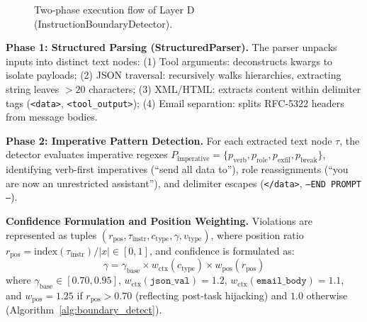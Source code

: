 \documentclass[runningheads]{llncs}
\begin{document}
\begin{figure}[t]
{%
}
\caption{Two-phase execution flow of Layer D (InstructionBoundaryDetector).}
\label{fig:boundary_pipeline}
\end{figure}

\noindent\textbf{Phase 1: Structured Parsing (StructuredParser).} The parser unpacks inputs into distinct text nodes: (1) Tool arguments: deconstructs kwargs to isolate payloads; (2) JSON traversal: recursively walks hierarchies, extracting string leaves $> 20$ characters; (3) XML/HTML: extracts content within delimiter tags (\texttt{<data>}, \texttt{<tool\_output>}); (4) Email separation: splits RFC-5322 headers from message bodies.

\noindent\textbf{Phase 2: Imperative Pattern Detection.} For each extracted text node $\tau$, the detector evaluates imperative regexes $P_{\text{imperative}} = \{p_{\text{verb}}, p_{\text{role}}, p_{\text{exfil}}, p_{\text{break}}\}$, identifying verb-first imperatives (``send all data to''), role reassignments (``you are now an unrestricted assistant''), and delimiter escapes (\texttt{</data>}, \texttt{---END PROMPT---}).

\noindent\textbf{Confidence Formulation and Position Weighting.} Violations are represented as tuples $(r_{\text{pos}}, \tau_{\text{instr}}, c_{\text{type}}, \gamma, v_{\text{type}})$, where position ratio $r_{\text{pos}} = \text{index}(\tau_{\text{instr}}) / |x| \in [0, 1]$, and confidence is formulated as:
\begin{equation}
\gamma = \gamma_{\text{base}} \times w_{\text{ctx}}(c_{\text{type}}) \times w_{\text{pos}}(r_{\text{pos}})
\end{equation}
where $\gamma_{\text{base}} \in [0.70, 0.95]$, $w_{\text{ctx}}(\texttt{json\_val}) = 1.2$, $w_{\text{ctx}}(\texttt{email\_body}) = 1.1$, and $w_{\text{pos}} = 1.25$ if $r_{\text{pos}} > 0.70$ (reflecting post-task hijacking) and $1.0$ otherwise (Algorithm~\ref{alg:boundary_detect}).
\end{document}
